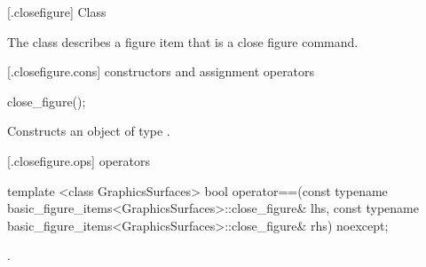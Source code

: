  [\iotwod.closefigure] {Class }%

\pnum
{}
The class  describes a figure item that is a close figure command.

 [\iotwod.closefigure.cons] { constructors and assignment operators}%

%
\begin{itemdecl}
close_figure();
\end{itemdecl}
\begin{itemdescr}
\pnum
\effects
Constructs an object of type .
\end{itemdescr}

 [\iotwod.closefigure.ops]{ operators}%

%
\begin{itemdecl}
template <class GraphicsSurfaces>
bool operator==(const typename basic_figure_items<GraphicsSurfaces>::close_figure& lhs,
  const typename basic_figure_items<GraphicsSurfaces>::close_figure& rhs) noexcept;
\end{itemdecl}
\begin{itemdescr}
\pnum
\returns
{}.
\end{itemdescr}
